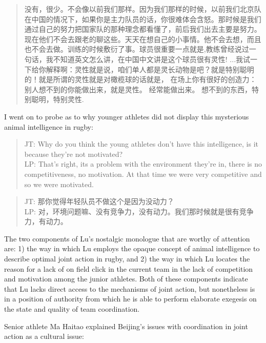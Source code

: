 \begin{CJK}{UTF8}{gbsn}
      \begin{quotation}
        没有，很少。不会像以前我们那样。因为我们那样的时候，以前我们北京队在中国的情况下，如果你是主力队员的话，你很难体会含怒。那时候是我们通过自己的努力把国家队的那种理念都看懂了，前后我们出去主要是努力。现在他们不会去跟老的聊这些。天天在想自己的小事情。他不会去想，而且也不会去做。训练的时候敷衍了事。球员很重要一点就是,教练曾经说过一句话，我不知道英文怎么讲，在中国中文讲是这个球员很有灵性! ...我试一下给你解释啊：灵性就是说，咱们单人都是灵长动物是吧？就是特别聪明的！就是所谓的灵性就是对橄榄球的话就是， 在场上你有很好的创造力：别人想不到的你能做出来，就是灵性。 经常能做出来。 想不到的东西，特别聪明，特别灵性.
      \end{quotation}

I went on to probe as to why younger athletes did not display this mysterious animal intelligence in rugby:

\begin{quotation}
      JT: Why do you think the young athletes don't have this intelligence, is it because they're not motivated? \\
      LP: That's right, its a problem with the environment they're in, there is no competitiveness, no motivation.  At that time we were very competitive and so we were motivated.
\end{quotation}

\begin{quotation}
      JT: 那你觉得年轻队员不做这个是因为没动力？\\
      LP: 对，环境问题嘛、没有竞争力，没有动力。我们那时候就是很有竞争力，有动力。
\end{quotation}

The two components of Lu's nostalgic monologue that are worthy of attention are: 1) the way in which Lu employs the opaque concept of animal intelligence to describe optimal joint action in rugby, and 2) the way in which Lu locates the reason for a lack of on field click in the current team in the lack of competition and motivation among the junior athletes.  Both of these components indicate that Lu lacks direct access to the mechanisms of joint action, but nonetheless is in a position of authority from which he is able to perform elaborate exegesis on the state and quality of team coordination.

Senior athlete Ma Haitao explained Beijing's issues with coordination in joint action as a cultural issue:


\end{CJK}
